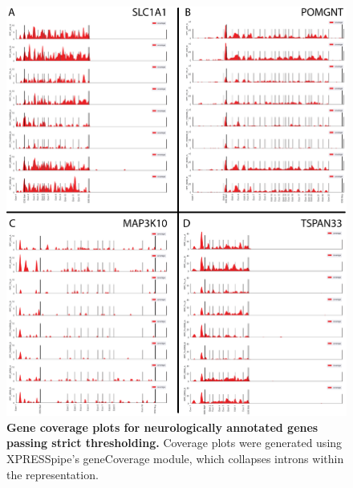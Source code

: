 \documentclass[10pt, oneside]{article}
\begin{document}
\begin{figure}
\centering
  \includegraphics[width=180mm]{figures/xpresspipe_supplement6.png}
  \caption{\textbf{Gene coverage plots for neurologically annotated genes passing strict thresholding.} Coverage plots were generated using XPRESSpipe's geneCoverage module, which collapses introns within the representation.}
  \label{fig:supplement6}
\end{figure}
\end{document}
